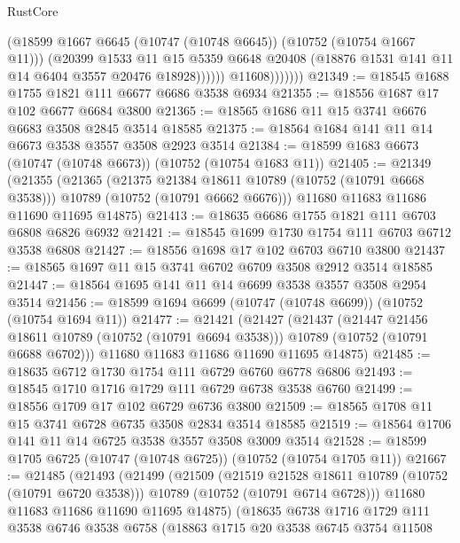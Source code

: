 \begin{lexlean}{RustCore}
\begin{coremodule}
                          (@18599 @1667 @6645 (@10747 (@10748 @6645)) (@10752 (@10754 @1667 @11)))
                          (@20399
                            @1533
                            @11
                            @15
                            @5359
                            @6648
                            @20408
                            (@18876 @1531 @141 @11 @14 @6404 @3557 @20476 @18928))))))
                  @11608)))))))
@21349 := @18545 @1688 @1755 @1821 @111 @6677 @6686 @3538 @6934
@21355 := @18556 @1687 @17 @102 @6677 @6684 @3800
@21365 := @18565 @1686 @11 @15 @3741 @6676 @6683 @3508 @2845 @3514 @18585
@21375 := @18564 @1684 @141 @11 @14 @6673 @3538 @3557 @3508 @2923 @3514
@21384 := @18599 @1683 @6673 (@10747 (@10748 @6673)) (@10752 (@10754 @1683 @11))
@21405 := @21349
    (@21355
      (@21365
        (@21375 @21384 @18611 @10789 (@10752 (@10791 @6668 @3538)))
        @10789
        (@10752 (@10791 @6662 @6676)))
      @11680
      @11683
      @11686
      @11690
      @11695
      @14875)
@21413 := @18635 @6686 @1755 @1821 @111 @6703 @6808 @6826 @6932
@21421 := @18545 @1699 @1730 @1754 @111 @6703 @6712 @3538 @6808
@21427 := @18556 @1698 @17 @102 @6703 @6710 @3800
@21437 := @18565 @1697 @11 @15 @3741 @6702 @6709 @3508 @2912 @3514 @18585
@21447 := @18564 @1695 @141 @11 @14 @6699 @3538 @3557 @3508 @2954 @3514
@21456 := @18599 @1694 @6699 (@10747 (@10748 @6699)) (@10752 (@10754 @1694 @11))
@21477 := @21421
    (@21427
      (@21437
        (@21447 @21456 @18611 @10789 (@10752 (@10791 @6694 @3538)))
        @10789
        (@10752 (@10791 @6688 @6702)))
      @11680
      @11683
      @11686
      @11690
      @11695
      @14875)
@21485 := @18635 @6712 @1730 @1754 @111 @6729 @6760 @6778 @6806
@21493 := @18545 @1710 @1716 @1729 @111 @6729 @6738 @3538 @6760
@21499 := @18556 @1709 @17 @102 @6729 @6736 @3800
@21509 := @18565 @1708 @11 @15 @3741 @6728 @6735 @3508 @2834 @3514 @18585
@21519 := @18564 @1706 @141 @11 @14 @6725 @3538 @3557 @3508 @3009 @3514
@21528 := @18599 @1705 @6725 (@10747 (@10748 @6725)) (@10752 (@10754 @1705 @11))
@21667 := @21485
    (@21493
      (@21499
        (@21509
          (@21519 @21528 @18611 @10789 (@10752 (@10791 @6720 @3538)))
          @10789
          (@10752 (@10791 @6714 @6728)))
        @11680
        @11683
        @11686
        @11690
        @11695
        @14875)
      (@18635
        @6738
        @1716
        @1729
        @111
        @3538
        @6746
        @3538
        @6758
        (@18863
          @1715
          @20
          @3538
          @6745
          @3754
          @11508

\end{coremodule}
\end{lexlean}

